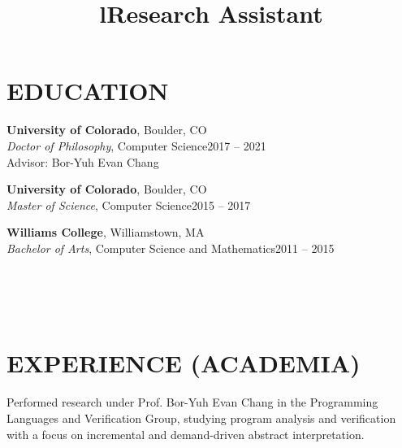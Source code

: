\documentclass[margin]{res}
\begin{document}
\begin{resume}

\section{EDUCATION}
\textbf{University of Colorado}, Boulder, CO\\
{\sl Doctor of Philosophy}, Computer Science\hfill 2017 -- 2021\\
Advisor: Bor-Yuh Evan Chang

\textbf{University of Colorado}, Boulder, CO\\
{\sl Master of Science}, Computer Science\hfill 2015 -- 2017

\textbf{Williams College}, Williamstown, MA\\
{\sl Bachelor of Arts}, Computer Science and Mathematics\hfill 2011 -- 2015


\begin{format}
\title{l}\\
\\
\body\\
\end{format}

\section{EXPERIENCE (ACADEMIA)}
\title{\textbf{Research Assistant}}
\begin{position}
Performed research under Prof. Bor-Yuh Evan Chang in the Programming Languages and Verification Group, studying program analysis and verification with a focus on incremental and demand-driven abstract interpretation.
\end{position}


\end{resume}
\end{document}

